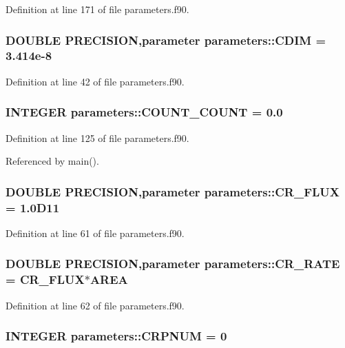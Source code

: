 Definition at line 171 of file parameters.f90.\hypertarget{namespaceparameters_a1f6362692e1384b097b58b185096b416}{
\subsubsection[{CDIM}]{\setlength{\rightskip}{0pt plus 5cm}DOUBLE PRECISION,parameter {\bf parameters::CDIM} = 3.414e-\/8}}
\label{namespaceparameters_a1f6362692e1384b097b58b185096b416}


Definition at line 42 of file parameters.f90.\hypertarget{namespaceparameters_a6d79ed13a3233e19e1602e4410b72e7c}{
\subsubsection[{COUNT\_\-COUNT}]{\setlength{\rightskip}{0pt plus 5cm}INTEGER {\bf parameters::COUNT\_\-COUNT} = 0.0}}
\label{namespaceparameters_a6d79ed13a3233e19e1602e4410b72e7c}


Definition at line 125 of file parameters.f90.

Referenced by main().\hypertarget{namespaceparameters_ad9a62be82a2fb56fe291f73d3279d4b4}{
\subsubsection[{CR\_\-FLUX}]{\setlength{\rightskip}{0pt plus 5cm}DOUBLE PRECISION,parameter {\bf parameters::CR\_\-FLUX} = 1.0D11}}
\label{namespaceparameters_ad9a62be82a2fb56fe291f73d3279d4b4}


Definition at line 61 of file parameters.f90.\hypertarget{namespaceparameters_ac433c7adc61bc138dfc7567a570833ed}{
\subsubsection[{CR\_\-RATE}]{\setlength{\rightskip}{0pt plus 5cm}DOUBLE PRECISION,parameter {\bf parameters::CR\_\-RATE} = {\bf CR\_\-FLUX}$\ast${\bf AREA}}}
\label{namespaceparameters_ac433c7adc61bc138dfc7567a570833ed}


Definition at line 62 of file parameters.f90.\hypertarget{namespaceparameters_a27421c52f58f3c001c10f65e12931269}{
\subsubsection[{CRPNUM}]{\setlength{\rightskip}{0pt plus 5cm}INTEGER {\bf parameters::CRPNUM} = 0}}
\label{namespaceparameters_a27421c52f58f3c001c10f65e12931269}


